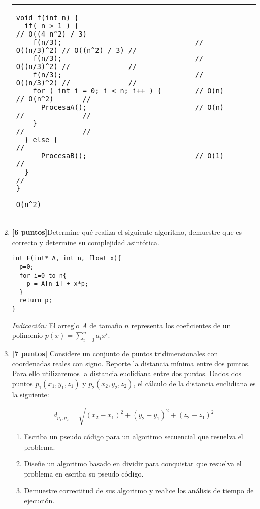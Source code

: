 \documentclass[10pt]{article}
\begin{document}
\begin{enumerate}
\begin{scriptsize}
\begin{tabular}{ll}
\begin{minipage}{3in}
\begin{verbatim}
void f(int n) {
  if( n > 1 ) {                                                          // O((4 n^2) / 3)
    f(n/3);                                // O((n/3)^2) // O((n^2) / 3) //
    f(n/3);                                // O((n/3)^2) //              //
    f(n/3);                                // O((n/3)^2) //              //
    for ( int i = 0; i < n; i++ ) {        // O(n)       // O(n^2)       //
      ProcesaA();                          // O(n)       //              //
    }                                                    //              //
  } else {                                                               //
      ProcesaB();                          // O(1)                       //
  }                                                                      //
}

O(n^2)
\end{verbatim}

\end{minipage}
\end{tabular}
\end{scriptsize}

\clearpage

\item \textbf{[6 puntos]}Determine qué realiza el siguiente algoritmo, demuestre que es correcto y determine su complejidad asintótica.

\begin{scriptsize}
\begin{verbatim}
int F(int* A, int n, float x){
  p=0;
  for i=0 to n{
    p = A[n-i] + x*p;
  }
  return p;
}
\end{verbatim}
\end{scriptsize}

\textit{Indicación:} El arreglo $A$ de tamaño $n$ representa los coeficientes de un polinomio $p(x)=\sum_{i=0}^na_ix^i$.

\item \textbf{[7 puntos]} Considere un conjunto de puntos tridimensionales con coordenadas reales con signo. Reporte la distancia mínima entre dos puntos. Para ello utilizaremos la distancia euclidiana entre dos puntos. Dados dos puntos $p_1(x_1,y_1,z_1)$ y $p_2(x_2,y_2,z_2)$, el cálculo de la distancia euclidiana es la siguiente:

\begin{equation*}
    d_{p_1,p_2} = \sqrt{(x_2-x_1)^2+(y_2-y_1)^2+(z_2-z_1)^2}
\end{equation*}

\begin{enumerate}
    \item Escriba un pseudo código para un algoritmo secuencial que resuelva el problema.
    \item Diseñe un algoritmo basado en dividir para conquistar que resuelva el problema en escriba su pseudo código.
    \item Demuestre correctitud de sus algoritmo y realice los análisis de tiempo de ejecución.
\end{enumerate}



\end{enumerate}
\end{document}
